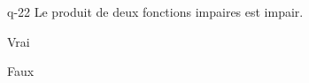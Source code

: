 \begin{truefalse}{q-22}
Le produit de deux fonctions impaires est impair.
\item Vrai
\item* Faux
\end{truefalse}

